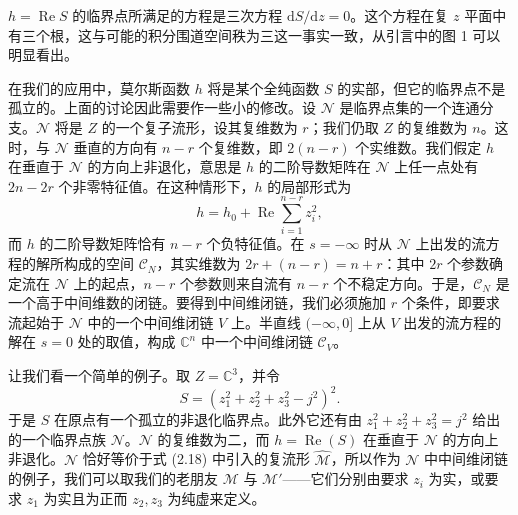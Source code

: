 \documentclass[11pt,a4paper,UTF8]{ctexart}
\theoremstyle{plain}
\theoremstyle{definition}
\begin{document}

$h=\operatorname{Re}S$ 的临界点所满足的方程是三次方程 $\mathrm{d}S/\mathrm{d}z=0$。这个方程在复 $z$ 平面中有三个根，这与可能的积分围道空间秩为三这一事实一致，从引言中的图 1 可以明显看出。

在我们的应用中，莫尔斯函数 $h$ 将是某个全纯函数 $S$ 的实部，但它的临界点不是孤立的。上面的讨论因此需要作一些小的修改。设 $\mathcal N$ 是临界点集的一个连通分支。$\mathcal N$ 将是 $Z$ 的一个复子流形，设其复维数为 $r$；我们仍取 $Z$ 的复维数为 $n$。这时，与 $\mathcal N$ 垂直的方向有 $n-r$ 个复维数，即 $2(n-r)$ 个实维数。我们假定 $h$ 在垂直于 $\mathcal N$ 的方向上非退化，意思是 $h$ 的二阶导数矩阵在 $\mathcal N$ 上任一点处有 $2n-2r$ 个非零特征值。在这种情形下，$h$ 的局部形式为
\[
    h=h_0+\operatorname{Re}\sum_{i=1}^{n-r}z_i^2,
\]
而 $h$ 的二阶导数矩阵恰有 $n-r$ 个负特征值。在 $s=-\infty$ 时从 $\mathcal N$ 上出发的流方程的解所构成的空间 $\mathcal C_N$，其实维数为 $2r+(n-r)=n+r$：其中 $2r$ 个参数确定流在 $\mathcal N$ 上的起点，$n-r$ 个参数则来自流有 $n-r$ 个不稳定方向。于是，$\mathcal C_N$ 是一个高于中间维数的闭链。要得到中间维闭链，我们必须施加 $r$ 个条件，即要求流起始于 $\mathcal N$ 中的一个中间维闭链 $V$ 上。半直线 $(-\infty,0]$ 上从 $V$ 出发的流方程的解在 $s=0$ 处的取值，构成 $\mathbb C^n$ 中一个中间维闭链 $\mathcal C_V$。


让我们看一个简单的例子。取 $Z=\mathbb C^3$，并令
\begin{equation}
    S=(z_1^2+z_2^2+z_3^2-j^2)^2.
    \tag{2.33}
\end{equation}
于是 $S$ 在原点有一个孤立的非退化临界点。此外它还有由 $z_1^2+z_2^2+z_3^2=j^2$ 给出的一个临界点族 $\mathcal N$。$\mathcal N$ 的复维数为二，而 $h=\operatorname{Re}(S)$ 在垂直于 $\mathcal N$ 的方向上非退化。$\mathcal N$ 恰好等价于式 (2.18) 中引入的复流形 $\widehat{\mathcal M}$，所以作为 $\mathcal N$ 中中间维闭链的例子，我们可以取我们的老朋友 $\mathcal M$ 与 $\mathcal M'$——它们分别由要求 $z_i$ 为实，或要求 $z_1$ 为实且为正而 $z_2,z_3$ 为纯虚来定义。
\end{document}
